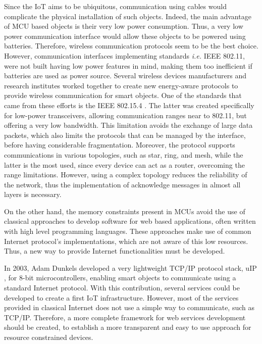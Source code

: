 Since the IoT aims to be ubiquitous, communication using cables would complicate the physical installation of such objects.
Indeed, the main advantage of MCU based objects is their very low power consumption.
Thus, a very low power communication interface would allow these objects to be powered using batteries.
Therefore, wireless communication protocols seem to be the best choice.
However, communication interfaces implementing standards \textit{i.e.} IEEE 802.11, were not built having low power features in mind, making them too inefficient if batteries are used as power source.
Several wireless devices manufacturers and research institutes worked together to create new energy-aware protocols to provide wireless communication for smart objects.
One of the standards that came from these efforts is the IEEE 802.15.4 \cite{ieee802.15.4}.
The latter was created specifically for low-power transceivers, allowing communication ranges near to 802.11, but offering a very low bandwidth.
This limitation avoids the exchange of large data packets, which also limits the protocols that can be managed by the interface, before having considerable fragmentation.
Moreover, the protocol supports communications in various topologies, such as star, ring, and mesh, while the latter is the most used, since every device can act as a router, overcoming the range limitations.
However, using a complex topology reduces the reliability of the network, thus the implementation of acknowledge messages in almost all layers is necessary.


On the other hand, the memory constraints present in MCUs avoid the use of classical approaches to develop software for web based applications, often written with high level programming languages.
These approaches make use of common Internet protocol's implementations, which are not aware of this low resources.
Thus, a new way to provide Internet functionalities must be developed.

In 2003, Adam Dunkels developed a very lightweight TCP/IP protocol stack, uIP \cite{dunkels03full}, for 8-bit microcontrollers, enabling smart objects to communicate using a standard Internet protocol.
With this contribution, several services could be developed to create a first IoT infrastructure.
However, most of the services provided in classical Internet does not use a simple way to communicate, such as TCP/IP.
Therefore, a more complete framework for web services development should be created, to establish a more transparent and easy to use approach for resource constrained devices.

